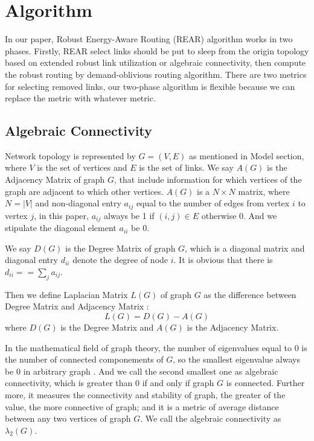 \documentclass[conference]{IEEEtran}
\begin{document}
\section{Algorithm}
In our paper, Robust Energy-Aware Routing (REAR) algorithm works in two phases. Firstly, REAR select links 
should be put to sleep from the origin topology based on extended robust link utilization or algebraic connectivity, 
then compute the robust routing by demand-oblivious routing algorithm. There are two metrics
for selecting removed links, our two-phase algorithm is flexible because we can replace the metric with whatever
metric.


\subsection{Algebraic Connectivity}
Network topology is represented by $G = (V, E)$ as mentioned in Model section, where $V$ is the set of vertices
and $E$ is the set of links. We say $A(G)$ is the Adjacency Matrix of graph $G$, that include information for which
vertices of the graph are adjacent to which other vertices. $A(G)$ is a $N \times N$ matrix, where
$N = |V|$ and non-diagonal entry $a_{ij}$ equal to the number of edges from vertex $i$ to vertex $j$, in this paper,
$a_{ij}$ always be 1 if $(i,j) \in E$ otherwise 0. And we stipulate the diagonal element $a_{ii}$ be 0.


We say $D(G)$ is the Degree Matrix of graph $G$, which is a diagonal matrix and diagonal entry $d_{ii}$ denote 
the degree of node $i$. It is obvious that there is $d_{ii} == \sum_{j} a_{ij}$.


Then we define Laplacian Matrix $L(G)$ of graph $G$ as the difference between Degree Matrix and Adjacency Matrix :
\begin{equation}
	L(G) = D(G) - A(G)
\end{equation}
where $D(G)$ is the Degree Matrix and $A(G)$ is the Adjacency Matrix.


In the mathematical field of graph theory, the number of eigenvalues equal to 0 is the number of connected 
componements of $G$, so the smallest eigenvalue always be 0 in arbitrary graph . And we call the second smallest one as
algebraic connectivity, which is greater than 0 if and only if graph $G$ is connected. Further more,  
it measures the connectivity and stability of graph, the greater of the value, the more connective of graph;
and it is a metric of average distance between any two vertices of graph $G$. We call the algebraic connectivity as
$\lambda_2(G)$.
\end{document}
